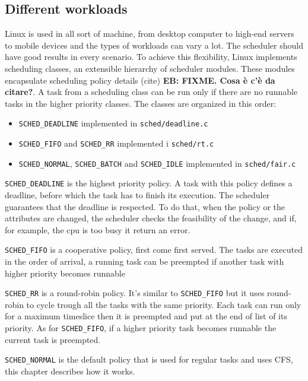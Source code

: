 \documentclass[10pt, oneside]{book}
\newcommand{\mycomment}[1]{\textbf{#1}}  %
\begin{document}
\subsection{Different workloads}  %
Linux is used in all sort of machine, from desktop computer to high-end servers to mobile devices and the types of workloads can vary a lot. The scheduler should have good results in every scenario. To achieve this flexibility, Linux implements scheduling classes, an extensible hierarchy of scheduler modules. These modules encapsulate scheduling policy details (cite) \mycomment{EB: FIXME. Cosa \`e c'\`e da citare?}. A task from a scheduling class can be run only if there are no runnable tasks in the higher priority classes. The classes are organized in this order: 
\begin{itemize}
\item \verb|SCHED_DEADLINE| implemented in \verb|sched/deadline.c|
\item \verb|SCHED_FIFO| and \verb|SCHED_RR| implemented i
  \verb|sched/rt.c|
\item \verb|SCHED_NORMAL|, \verb|SCHED_BATCH| and
  \verb|SCHED_IDLE| %
  implemented in \verb|sched/fair.c|%
\end{itemize}

\verb|SCHED_DEADLINE| is the highest priority policy. A task with this policy defines a deadline, before which the task has to finish its execution. The scheduler guarantees that the deadline is respected. To do that, when the policy or the attributes are changed, the scheduler checks the feasibility of the change, and if, for example, the cpu is too busy it return an error.

\verb|SCHED_FIFO| is a cooperative policy, first come first served. The tasks are executed in the order of arrival, a running task can be preempted if another task with higher priority becomes runnable

\verb|SCHED_RR| is a round-robin policy. It's similar to \verb|SCHED_FIFO| but it uses round-robin to cycle trough all the tasks with the same priority. Each task can run only for a maximum timeslice then it is preempted and put at the end of list of its priority. As for \verb|SCHED_FIFO|, if a higher priority task becomes runnable the current task is preempted.

\verb|SCHED_NORMAL| is the default policy that is used for regular tasks and uses CFS, this chapter describes how it works.
\end{document}
